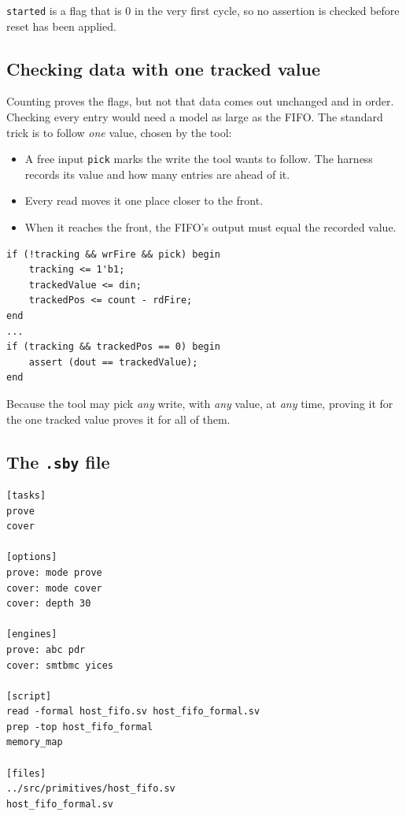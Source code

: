 \documentclass[11pt,a4paper]{article}
\newcommand{\file}[1]{\texttt{#1}}
\begin{document}
\texttt{started} is a flag that is 0 in the very first cycle, so no assertion is checked before reset has been applied.

\subsection{Checking data with one tracked value}

Counting proves the flags, but not that data comes out unchanged and in order. Checking every entry would need a model as large as the FIFO. The standard trick is to follow \emph{one} value, chosen by the tool:

\begin{itemize}
\item A free input \texttt{pick} marks the write the tool wants to follow. The harness records its value and how many entries are ahead of it.
\item Every read moves it one place closer to the front.
\item When it reaches the front, the FIFO's output must equal the recorded value.
\end{itemize}

\begin{lstlisting}
if (!tracking && wrFire && pick) begin
	tracking <= 1'b1;
	trackedValue <= din;
	trackedPos <= count - rdFire;
end
...
if (tracking && trackedPos == 0) begin
	assert (dout == trackedValue);
end
\end{lstlisting}

Because the tool may pick \emph{any} write, with \emph{any} value, at \emph{any} time, proving it for the one tracked value proves it for all of them.

\subsection{The \file{.sby} file}

\begin{lstlisting}
[tasks]
prove
cover

[options]
prove: mode prove
cover: mode cover
cover: depth 30

[engines]
prove: abc pdr
cover: smtbmc yices

[script]
read -formal host_fifo.sv host_fifo_formal.sv
prep -top host_fifo_formal
memory_map

[files]
../src/primitives/host_fifo.sv
host_fifo_formal.sv
\end{lstlisting}
\end{document}

